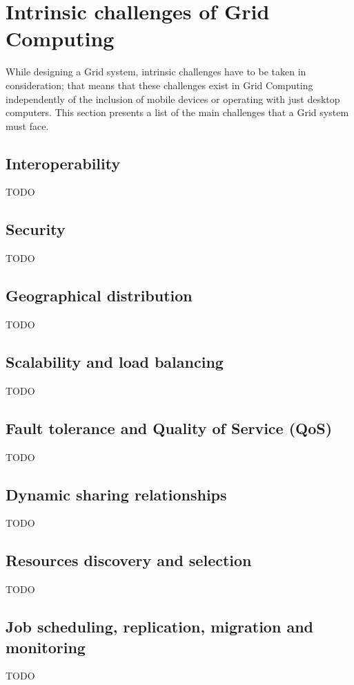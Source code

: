 \section{Intrinsic challenges of Grid Computing}
While designing a Grid system, intrinsic challenges have to be taken in consideration; that means that these challenges exist in Grid Computing independently of the inclusion of mobile devices or operating with just desktop computers. This section presents a list of the main challenges that a Grid system must face.
\vspace{20mm}

\subsection{Interoperability}
TODO

\subsection{Security}
TODO

\subsection{Geographical distribution}
TODO

\subsection{Scalability and load balancing}
TODO

\subsection{Fault tolerance and Quality of Service (QoS)}
TODO

\subsection{Dynamic sharing relationships}
TODO

\subsection{Resources discovery and selection}
TODO

\subsection{Job scheduling, replication, migration and monitoring}
TODO
